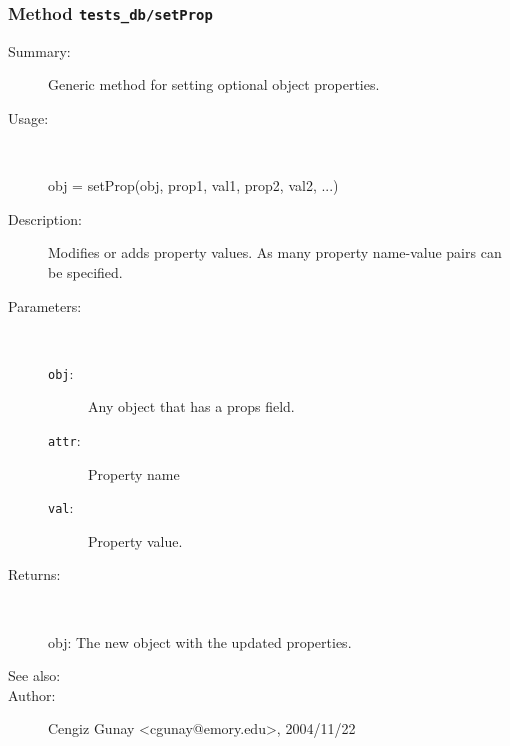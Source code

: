 \subsubsection[Method \texttt{setProp}]{Method \texttt{tests\_db/setProp}}%
%
\label{ref_tests_db__setProp}%
\hypertarget{ref_tests_db__setProp}{}%
\begin{description}
\item[Summary:]Generic method for setting optional object properties.
%
\item[Usage:]~%
\begin{lyxcode}%
obj = setProp(obj, prop1, val1, prop2, val2, ...)
%
\end{lyxcode}%
%
\item[Description:]%
Modifies or adds property values. As many property name-value 
 pairs can be specified.
\item[Parameters:]~
\begin{description}%
\item[\texttt{obj}:]
 Any object that has a props field.
\item[\texttt{attr}:]
 Property name
\item[\texttt{val}:]
 Property value.
\end{description}%
%
\item[Returns:
]~

	obj: The new object with the updated properties.
%
%
\item[See also:]%
%
\item[Author:]%
Cengiz Gunay <cgunay@emory.edu>, 2004/11/22
%
\end{description}
\methodline%

